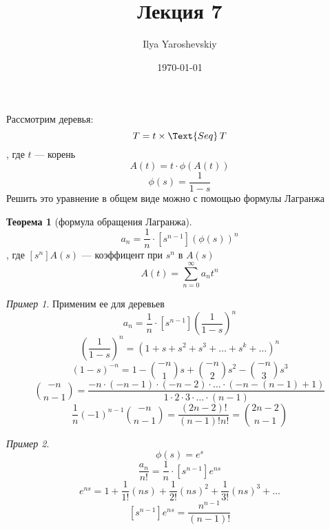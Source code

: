 \documentclass[english]{article}
\author{Ilya Yaroshevskiy}
\date{\today}
\title{Лекция 7}
\theoremstyle{plain}
\theoremstyle{remark}
\newtheorem*{examp}{Пример}
\theoremstyle{definition}
\newtheorem{theorem}{Теорема}[section]
\begin{document}
\maketitle
\tableofcontents

\newcommand{\stirlF}[2]{\left[\begin{matrix} #1 \\ #2 \end{matrix}\right]}
\newcommand{\stirlS}[2]{\left\{\begin{matrix} #1 \\ #2 \end{matrix}\right\}}
\newcommand{\Set}{\text{Set}\,}
\newcommand{\Seq}{\text{Seq}\,}
\newcommand{\Cyc}{\text{Cyc}\,}


Рассмотрим деревья:
\[ T = t \times \Text{Seq}\,T \]
, где \(t\) --- корень
\[ A(t) = t\cdot \phi(A(t)) \]
\[ \phi(s) = \frac{1}{1 - s} \]
Решить это уравнение в общем виде можно с помощью формулы Лагранжа
\begin{theorem}[формула обращения Лагранжа]
\[ a_n = \frac{1}{n}\cdot[s^{n - 1}](\phi(s))^n \], где \([s^{n}]A(s)\) --- коэффицент при \(s^n\) в \(A(s)\)
\[ A(t) = \sum_{n = 0}^\infty a_n t^n \]
\end{theorem}
\begin{examp}
Применим ее для деревьев
\[ a_n = \frac{1}{n}\cdot[s^{n - 1}]\left(\frac{1}{1 - s}\right)^n \]
\[ \left(\frac{1}{1 - s}\right)^n = (1 + s + s^2 + s^3 + \dots + s^k + \dots)^n \]
\[ (1 - s)^{-n} = 1 - \binom{-n}{1} s + \binom{-n}{2}s^2 - \binom{-n}{3}s^3 \]
\[ \binom{-n}{n - 1} = \frac{-n\cdot(-n - 1)\cdot(-n - 2)\cdot\dots\cdot(-n - (n - 1) + 1)}{1\cdot 2 \cdot 3 \cdot \dots \cdot (n - 1)} \]
\[ \frac{1}{n}(-1)^{n - 1}\binom{-n}{n - 1} = \frac{(2n - 2)!}{(n - 1)!n!} = \binom{2n - 2}{n - 1} \]
\end{examp}
\begin{examp}
\[ \phi(s) = e^s \]
\[ \frac{a_n}{n!} = \frac{1}{n}\cdot[s^{n- 1}] e^{ns} \]
\[ e^{ns} = 1 + \frac{1}{1!}(ns) + \frac{1}{2!}(ns)^2 + \frac{1}{3!}(ns)^3 + \dots \]
\[ [s^{n - 1}]e^{ns} = \frac{n^{n - 1}}{(n - 1)!} \]
\end{examp}
\end{document}
